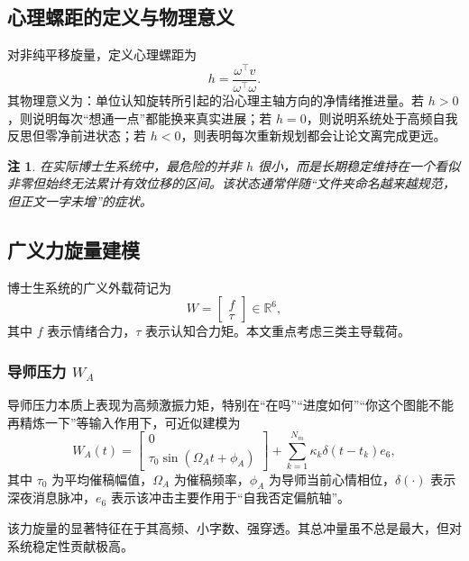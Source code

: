 \documentclass[UTF8,twocolumn,a4paper]{ctexart}
\newtheorem{remark}{注}
\begin{document}
\subsection{心理螺距的定义与物理意义}

对非纯平移旋量，定义心理螺距为
\begin{equation}
h=\frac{\omega^\top v}{\omega^\top \omega}.
\end{equation}
其物理意义为：单位认知旋转所引起的沿心理主轴方向的净情绪推进量。若 $h>0$，则说明每次“想通一点”都能换来真实进展；若 $h=0$，则说明系统处于高频自我反思但零净前进状态；若 $h<0$，则表明每次重新规划都会让论文离完成更远。

\begin{remark}
在实际博士生系统中，最危险的并非 $h$ 很小，而是长期稳定维持在一个看似非零但始终无法累计有效位移的区间。该状态通常伴随“文件夹命名越来越规范，但正文一字未增”的症状。
\end{remark}

\subsection{广义力旋量建模}

博士生系统的广义外载荷记为
\begin{equation}
W=
\begin{bmatrix}
f\\
\tau
\end{bmatrix}\in\mathbb{R}^6,
\end{equation}
其中 $f$ 表示情绪合力，$\tau$ 表示认知合力矩。本文重点考虑三类主导载荷。

\subsubsection{导师压力 $W_A$}

导师压力本质上表现为高频激振力矩，特别在“在吗”“进度如何”“你这个图能不能再精炼一下”等输入作用下，可近似建模为
\begin{equation}
W_A(t)=
\begin{bmatrix}
0\\
\tau_0\sin(\Omega_A t+\phi_A)
\end{bmatrix}
+\sum_{k=1}^{N_m}
\kappa_k\delta(t-t_k)e_6,
\end{equation}
其中 $\tau_0$ 为平均催稿幅值，$\Omega_A$ 为催稿频率，$\phi_A$ 为导师当前心情相位，$\delta(\cdot)$ 表示深夜消息脉冲，$e_6$ 表示该冲击主要作用于“自我否定偏航轴”。

该力旋量的显著特征在于其高频、小字数、强穿透。其总冲量虽不总是最大，但对系统稳定性贡献极高。
\end{document}
